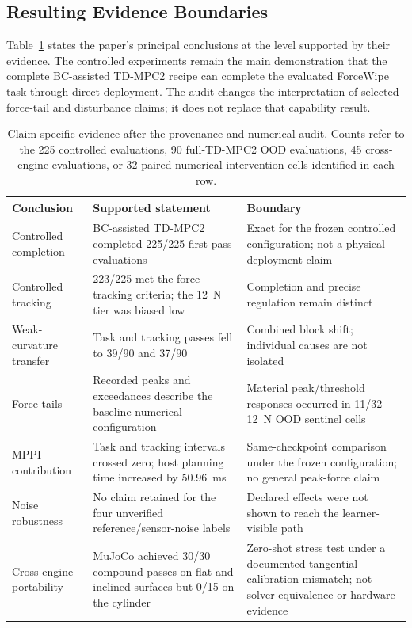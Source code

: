 \subsection{Resulting Evidence Boundaries}

Table~\ref{tab:evidence_boundaries} states the paper's principal conclusions
at the level supported by their evidence. The controlled experiments remain
the main demonstration that the complete BC-assisted TD-MPC2 recipe can
complete the evaluated ForceWipe task through direct deployment. The audit
changes the interpretation of selected force-tail and disturbance claims; it
does not replace that capability result.

\begin{table}[t]
\centering
\caption{Claim-specific evidence after the provenance and numerical audit.
Counts refer to the 225 controlled evaluations, 90 full-TD-MPC2 OOD
evaluations, 45 cross-engine evaluations, or 32 paired numerical-intervention
cells identified in each row.}
\label{tab:evidence_boundaries}
\small
\setlength{\tabcolsep}{4pt}
\begin{tabular}{@{}p{}p{}p{}@{}}
\toprule
Conclusion & Supported statement & Boundary \\
\midrule
Controlled completion & BC-assisted TD-MPC2 completed 225/225 first-pass evaluations & Exact for the frozen controlled configuration; not a physical deployment claim \\
Controlled tracking & 223/225 met the force-tracking criteria; the 12~N tier was biased low & Completion and precise regulation remain distinct \\
Weak-curvature transfer & Task and tracking passes fell to 39/90 and 37/90 & Combined block shift; individual causes are not isolated \\
Force tails & Recorded peaks and exceedances describe the baseline numerical configuration & Material peak/threshold responses occurred in 11/32 12~N OOD sentinel cells \\
MPPI contribution & Task and tracking intervals crossed zero; host planning time increased by 50.96~ms & Same-checkpoint comparison under the frozen configuration; no general peak-force claim \\
Noise robustness & No claim retained for the four unverified reference/sensor-noise labels & Declared effects were not shown to reach the learner-visible path \\
Cross-engine portability & MuJoCo achieved 30/30 compound passes on flat and inclined surfaces but 0/15 on the cylinder & Zero-shot stress test under a documented tangential calibration mismatch; not solver equivalence or hardware evidence \\
\bottomrule
\end{tabular}
\end{table}

